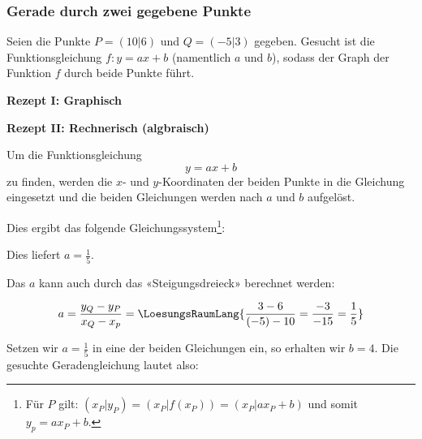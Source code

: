 
\subsubsection{Gerade durch zwei gegebene Punkte}

Seien die Punkte $P=(10|6)$ und $Q=(-5|3)$ gegeben.
Gesucht ist die Funktionsgleichung $f: y=ax+b$ (namentlich $a$ und $b$), sodass
der Graph der Funktion $f$ durch beide Punkte führt.


\textbf{Rezept I: Graphisch}\\

\vspace{1mm}



\textbf{Rezept II: Rechnerisch (algbraisch)}\\

\vspace{1mm}

\begin{rezept}{}{}
Um die Funktionsgleichung $$y=ax+b$$ zu finden,
  werden die $x$- und $y$-Koordinaten der beiden Punkte in die Gleichung eingesetzt und die beiden Gleichungen werden nach $a$ und $b$ aufgelöst. 
\end{rezept}

\noTRAINER{\vspace{12mm}}

Dies ergibt das folgende Gleichungssystem\footnote{Für $P$ gilt: $(x_P|y_P)=(x_P|f(x_P))=(x_P|ax_P+b)$ und somit $y_p =ax_P + b$.}:



Dies liefert $a=\frac{1}{5}$.

Das $a$ kann auch durch das «Steigungsdreieck» berechnet werden:

$$a = \frac{y_Q-y_P}{x_Q-x_p} = \LoesungsRaumLang{\frac{3 - 6}{(-5) - 10} = \frac{-3}{-15} = \frac{1}{5}}$$

Setzen wir $a=\frac{1}{5}$ in eine der beiden Gleichungen ein, so erhalten wir $b=4$. Die gesuchte Geradengleichung lautet also:

